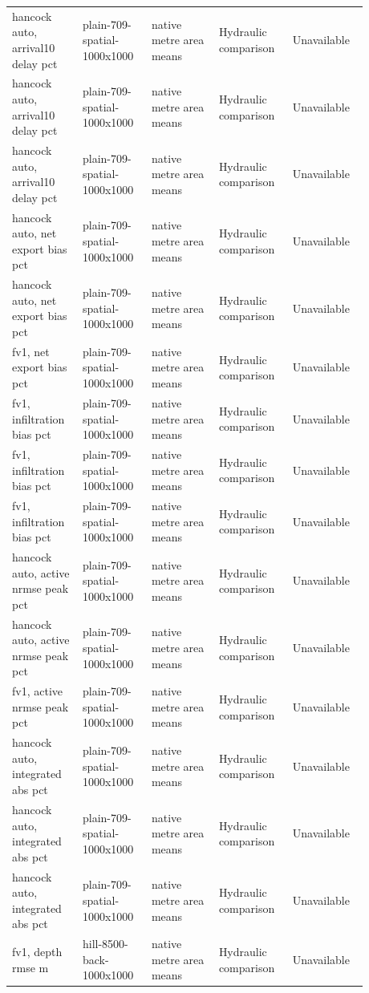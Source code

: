 \begin{longtable}{p{0.1760\linewidth}p{0.1760\linewidth}p{0.1760\linewidth}p{0.1760\linewidth}p{0.1760\linewidth}}
hancock auto, arrival10 delay pct & plain-709-spatial-1000x1000 & native metre area means & Hydraulic comparison & Unavailable \\
hancock auto, arrival10 delay pct & plain-709-spatial-1000x1000 & native metre area means & Hydraulic comparison & Unavailable \\
hancock auto, arrival10 delay pct & plain-709-spatial-1000x1000 & native metre area means & Hydraulic comparison & Unavailable \\
hancock auto, net export bias pct & plain-709-spatial-1000x1000 & native metre area means & Hydraulic comparison & Unavailable \\
hancock auto, net export bias pct & plain-709-spatial-1000x1000 & native metre area means & Hydraulic comparison & Unavailable \\
fv1, net export bias pct & plain-709-spatial-1000x1000 & native metre area means & Hydraulic comparison & Unavailable \\
fv1, infiltration bias pct & plain-709-spatial-1000x1000 & native metre area means & Hydraulic comparison & Unavailable \\
fv1, infiltration bias pct & plain-709-spatial-1000x1000 & native metre area means & Hydraulic comparison & Unavailable \\
fv1, infiltration bias pct & plain-709-spatial-1000x1000 & native metre area means & Hydraulic comparison & Unavailable \\
hancock auto, active nrmse peak pct & plain-709-spatial-1000x1000 & native metre area means & Hydraulic comparison & Unavailable \\
hancock auto, active nrmse peak pct & plain-709-spatial-1000x1000 & native metre area means & Hydraulic comparison & Unavailable \\
fv1, active nrmse peak pct & plain-709-spatial-1000x1000 & native metre area means & Hydraulic comparison & Unavailable \\
hancock auto, integrated abs pct & plain-709-spatial-1000x1000 & native metre area means & Hydraulic comparison & Unavailable \\
hancock auto, integrated abs pct & plain-709-spatial-1000x1000 & native metre area means & Hydraulic comparison & Unavailable \\
hancock auto, integrated abs pct & plain-709-spatial-1000x1000 & native metre area means & Hydraulic comparison & Unavailable \\
fv1, depth rmse m & hill-8500-back-1000x1000 & native metre area means & Hydraulic comparison & Unavailable \\

\end{longtable}
